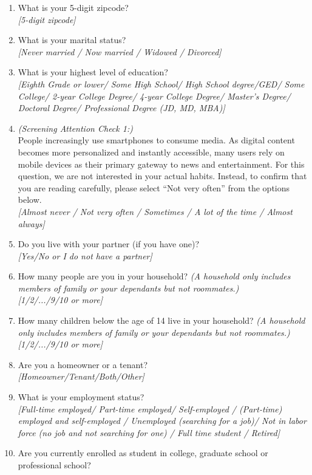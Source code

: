 \documentclass[11pt]{article}
\begin{document}
\begin{enumerate}
\item What is your 5-digit zipcode? \\ \textit{[5-digit zipcode]}
\item What is your marital status? \\ \textit{[Never married / Now married / Widowed / Divorced]}
\item What is your highest level of education? \\  
    \textit{[Eighth Grade or lower/ Some High School/ High School degree/GED/ Some College/ 2-year College Degree/ 4-year College Degree/ Master’s Degree/ Doctoral Degree/ Professional Degree (JD, MD, MBA)]}
\item \textit{(Screening Attention Check 1:)} \\ People increasingly use smartphones to consume media. As digital content becomes more personalized and instantly accessible, many users rely on mobile devices as their primary gateway to news and entertainment. For this question, we are not interested in your actual habits. Instead, to confirm that you are reading carefully, please select “Not very often” from the options below. \\\textit{[Almost never / Not very often / Sometimes / A lot of the time / Almost always]}
\item Do you live with your partner (if you have one)? \\ \textit{[Yes/No or I do not have a partner]}
\item How many people are you in your household? \textit{(A household only includes members of family or your dependants but not roommates.)} \\  \textit{[1/2/.../9/10 or more]} 
\item How many children below the age of 14 live in your household? \textit{(A household only includes members of family or your dependants but not roommates.)} \\  \textit{[1/2/.../9/10 or more]} 
\item  Are you a homeowner or a tenant? \\ \textit{[Homeowner/Tenant/Both/Other]}
 \item What is your employment status?\\
    \textit{[Full-time employed/ Part-time employed/ Self-employed / (Part-time) employed and self-employed / Unemployed (searching for a job)/ Not in labor force (no job and not searching for one) / Full time student / Retired]}
\item Are you currently enrolled as student in college, graduate school or professional school? \\

\end{enumerate}
\end{document}
